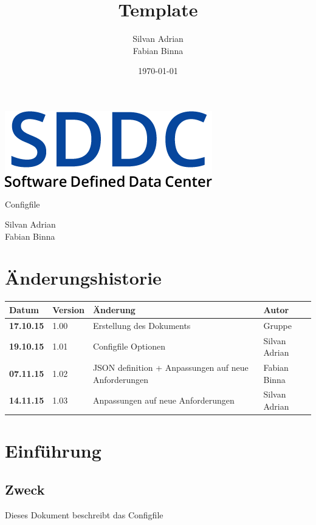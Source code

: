 \documentclass[11pt]{scrartcl}
\title{Template}
\author{Silvan Adrian \\ Fabian Binna}
\date{\today{}}
\begin{document}
\def\arraystretch{1.5}
\begin{titlepage}
\begin{center}
\vspace{10em}
\includegraphics[scale=2]{SDDC}
\vspace{10em}
\end{center}
\begin{center}
\huge {Configfile}
\end{center}
\begin{center}
\vspace{10em}
\LARGE {Silvan Adrian} \\
\LARGE {Fabian Binna}
\end{center}

\end{titlepage}

\newpage
\section{Änderungshistorie}
\begin{tabularx}{\linewidth}{l l X l}
\textbf{Datum} & \textbf{Version} & \textbf{Änderung}  & \textbf{Autor} \\
\hline
\textbf{17.10.15} & 1.00 & Erstellung des Dokuments & Gruppe \\
\textbf{19.10.15} & 1.01 & Configfile Optionen& Silvan Adrian \\
\textbf{07.11.15} & 1.02 & JSON definition + Anpassungen auf neue Anforderungen & Fabian Binna\\
\textbf{14.11.15} & 1.03 & Anpassungen auf neue Anforderungen & Silvan Adrian\\
\end{tabularx}

\newpage
\tableofcontents
\newpage
\section{Einführung}
\subsection{Zweck}
Dieses Dokument beschreibt das Configfile
\end{document}
